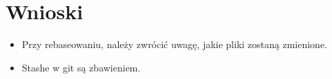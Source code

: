 	\newpage
\section{Wnioski}	%

\begin{itemize}
	\item Przy rebaseowaniu, należy zwrócić uwagę, jakie pliki zostaną zmienione. 
	\item Stashe w git są zbawieniem.
\end{itemize}

